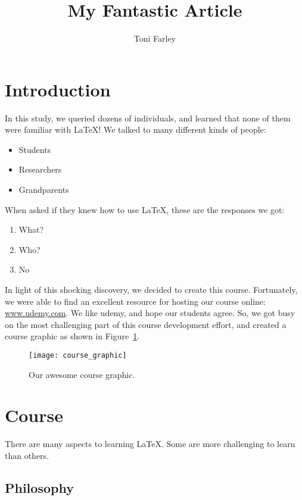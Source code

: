 \documentclass{proc}
\title{My Fantastic Article}
\author{Toni Farley}
\date{}
\begin{document}
\maketitle

\section{Introduction}

In this study, we queried dozens of individuals, and learned that none of them were familiar with \LaTeX!  We talked to many different kinds of people:

\begin{itemize}
\item Students
\item Researchers
\item Grandparents
\end{itemize}

\noindent When asked if they knew how to use \LaTeX, these are the responses we got:

\begin{enumerate}
\item What?
\item Who?
\item No
\end{enumerate}

In light of this shocking discovery, we decided to create this course. Fortunately, we were able to find an excellent resource for hosting our course online: \url{www.udemy.com}. We like udemy, and hope our students agree. So, we got busy on the most challenging part of this course development effort, and created a course graphic as shown in Figure~\ref{fig:course}.

\begin{figure}[htbp]
\begin{center}
\texttt{[image: course\_graphic]}
\caption{Our awesome course graphic.}
\label{fig:course}
\end{center}
\end{figure}

\section{Course}

There are many aspects to learning \LaTeX. Some are more challenging to learn than others. 

\subsection{Philosophy}
\end{document}
